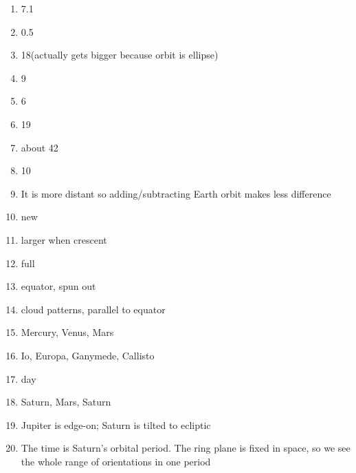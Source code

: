 \begin{enumerate} 

\item
7.1\deg

\item
0.5\deg

\item
18\arcsec (actually gets bigger because orbit is ellipse)


\item
9

\item
6\arcsec

\item
19\arcsec


\item
about 42\arcsec 

\item
10\arcsec


\item
It is more distant so adding/subtracting Earth orbit makes less difference

\item
new


\item
larger when crescent

\item
full

\item
equator, spun out 

\item
cloud patterns, parallel to equator

\item
Mercury, Venus, Mars


\item
Io, Europa, Ganymede, Callisto

\item
day

\item
Saturn, Mars, Saturn

\item
Jupiter is edge-on; Saturn is tilted to ecliptic


\item 
The time is Saturn's orbital period. The ring plane is fixed in space,
so we see the whole range of orientations in one period


\end{enumerate} 













